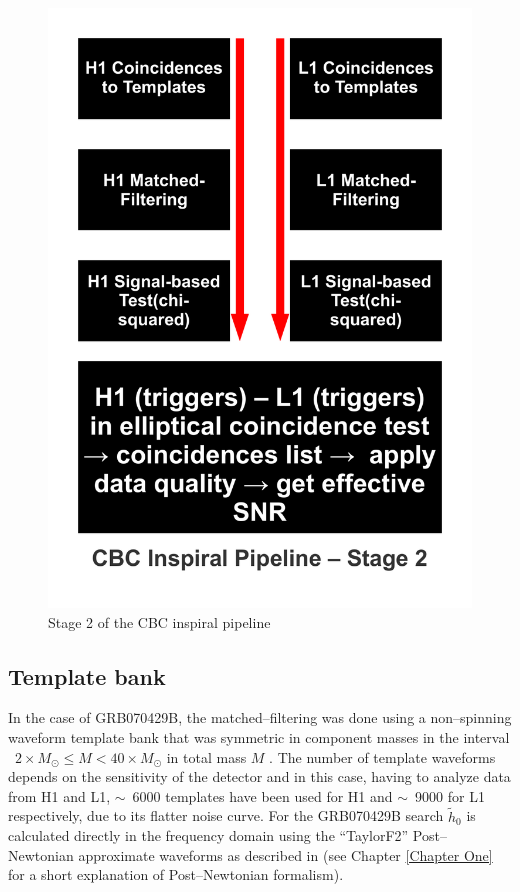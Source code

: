 \begin{figure}[htb!]
\centering
\includegraphics[scale=0.4]{Images/CBC_Stage_2.pdf}
\caption{Stage 2 of the CBC inspiral pipeline}
\label{cbcstage2}
\end{figure}
%

\subsection{Template bank}

In the case of GRB070429B, the matched--filtering was done using a non--spinning waveform template bank that was symmetric in component masses in the interval ~$2 \times M_{\odot} \leq M < 40 \times M_{\odot}$ in total mass $M$ \cite{Abadie:2010uf}. The number of template waveforms depends on the sensitivity of the detector and in this case, having to analyze data from H1 and L1, $\sim$~6000 templates have been used for H1 and $\sim$~9000 for L1 respectively, due to its flatter noise curve. For the GRB070429B search $\tilde{h}_0$ is calculated directly in the frequency domain using the ``TaylorF2'' Post--Newtonian approximate waveforms as described in \cite{Blanchet:2001dw} (see Chapter \ref{Chapter One} for a short explanation of Post--Newtonian formalism).

